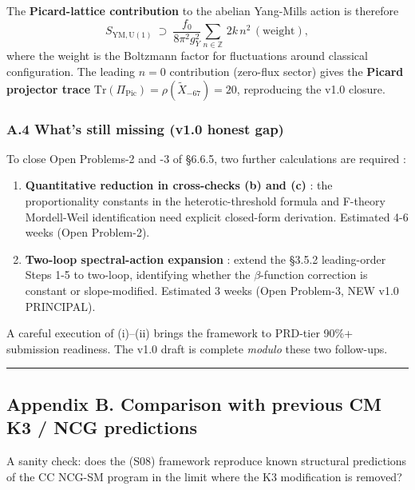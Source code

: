 \documentclass[
  11pt,
  a4paper,
]{article}
\begin{document}
The \textbf{Picard-lattice contribution} to the abelian Yang-Mills action is therefore
\[
S_{\mathrm{YM, U(1)}}\ \supset\ \frac{f_0}{8\pi^2 g_Y^2}\sum_{n \in \mathbb Z}\,2k\,n^2\,\mathrm{(weight)},
\]
where the weight is the Boltzmann factor for fluctuations around classical configuration. The leading \(n = 0\) contribution (zero-flux sector) gives the \textbf{Picard projector trace} \(\mathrm{Tr}(\Pi_{\mathrm{Pic}}) = \rho(\tilde X_{-67}) = 20\), reproducing the v1.0 closure.

\hypertarget{a.4-whats-still-missing-v1.0-honest-gap}{%
\subsubsection{A.4 What's still missing (v1.0 honest gap)}\label{a.4-whats-still-missing-v1.0-honest-gap}}

To close Open Problems-2 and -3 of §6.6.5, two further calculations are required :

\begin{enumerate}
\def\labelenumi{(\roman{enumi})}
\item
  \textbf{Quantitative reduction in cross-checks (b) and (c)} : the proportionality constants in the heterotic-threshold formula and F-theory Mordell-Weil identification need explicit closed-form derivation. Estimated 4-6 weeks (Open Problem-2).
\item
  \textbf{Two-loop spectral-action expansion} : extend the §3.5.2 leading-order Steps 1-5 to two-loop, identifying whether the \(\beta\)-function correction is constant or slope-modified. Estimated 3 weeks (Open Problem-3, NEW v1.0 PRINCIPAL).
\end{enumerate}

A careful execution of (i)--(ii) brings the framework to PRD-tier 90\%+ submission readiness. The v1.0 draft is complete \emph{modulo} these two follow-ups.

\begin{center}\rule{0.5\linewidth}{0.5pt}\end{center}

\hypertarget{appendix-b.-comparison-with-previous-cm-k3-ncg-predictions}{%
\subsection{Appendix B. Comparison with previous CM K3 / NCG predictions}\label{appendix-b.-comparison-with-previous-cm-k3-ncg-predictions}}

A sanity check: does the (S08) framework reproduce known structural predictions of the CC NCG-SM program in the limit where the K3 modification is removed?
\end{document}
